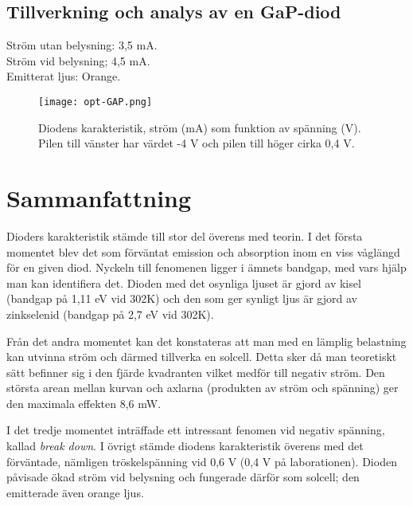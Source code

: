 \pagebreak
\subsection{Tillverkning och analys av en GaP-diod}
Ström utan belysning: 3,5 mA.\\
Ström vid belysning; 4,5 mA.\\
Emitterat ljus: Orange.
\begin{figure}[hb]
\centering
\texttt{[image: opt-GAP.png]}
\caption{Diodens karakteristik, ström (mA) som funktion av spänning (V). Pilen till vänster har värdet -4 V och pilen till höger cirka 0,4 V.}
\end{figure} 



\section{Sammanfattning}
Dioders karakteristik stämde till stor del överens med teorin. I det första momentet blev det som förväntat emission och absorption inom en viss våglängd för en given diod. Nyckeln till fenomenen ligger i ämnets bandgap, med vars hjälp man kan identifiera det. Dioden med det osynliga ljuset är gjord av kisel (bandgap på 1,11 eV vid 302K) och den som ger synligt ljus är gjord av zinkselenid (bandgap på 2,7 eV vid 302K).

Från det andra momentet kan det konstateras att man med en lämplig belastning kan utvinna ström och därmed tillverka en solcell. Detta sker då man teoretiskt sätt befinner sig i den fjärde kvadranten vilket medför till negativ ström. Den största arean mellan kurvan och axlarna (produkten av ström och spänning) ger den maximala effekten 8,6 mW.

I det tredje momentet inträffade ett intressant fenomen vid negativ spänning, kallad \textit{break down}. I övrigt stämde diodens karakteristik överens med det förväntade, nämligen tröskelspänning vid 0,6 V (0,4 V på laborationen). Dioden påvisade ökad ström vid belysning och fungerade därför som solcell; den emitterade även orange ljus.

